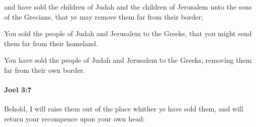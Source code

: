			\begin{versebox}
					\item[BHS] 
					\item[LXX] 
					\item[ASV] and have sold the children of Judah and the children of Jerusalem unto the sons of the Grecians, that ye may remove them far from their border;
					\item[NIV] You sold the people of Judah and Jerusalem to the Greeks, that you might send them far from their homeland.
					\item[NRSV] You have sold the people of Judah and Jerusalem to the Greeks, removing them far from their own border.
			\end{versebox}

		\paragraph{Joel 3:7} %
			\label{JOEL-3-7}

			Behold, I will raise them out of the place whither ye have sold them, and will return your recompence upon your own head:


